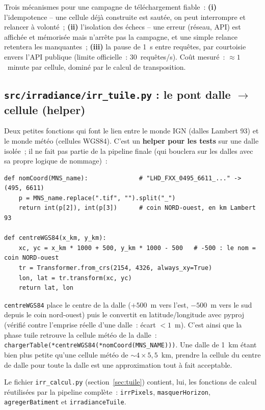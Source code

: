 \documentclass[11pt,a4paper]{article}
\newcommand{\fichier}[1]{\texttt{#1}}
\newcommand{\fonction}[1]{\texttt{#1}}
\begin{document}
Trois mécanismes pour une campagne de téléchargement fiable~:
\textbf{(i)} l'idempotence -- une cellule déjà construite est sautée, on peut
interrompre et relancer à volonté~; \textbf{(ii)} l'isolation des échecs -- une
erreur (réseau, API) est affichée et mémorisée mais n'arrête pas la campagne, et
une simple relance retentera les manquantes~; \textbf{(iii)} la pause de 1~s
entre requêtes, par courtoisie envers l'API publique (limite officielle~:
30~requêtes/s). Coût mesuré~: $\approx 1$~minute par cellule, dominé par le
calcul de transposition.

\subsection{\fichier{src/irradiance/irr\_tuile.py} : le pont dalle $\to$ cellule (helper)}
\label{sec:irrtuile}

Deux petites fonctions qui font le lien entre le monde IGN (dalles Lambert 93)
et le monde météo (cellules WGS84). C'est un \textbf{helper pour les tests} sur
une dalle isolée~; il ne fait pas partie de la pipeline finale (qui bouclera sur
les dalles avec sa propre logique de nommage)~:

\begin{lstlisting}
def nomCoord(MNS_name):              # "LHD_FXX_0495_6611_..." -> (495, 6611)
    p = MNS_name.replace(".tif", "").split("_")
    return int(p[2]), int(p[3])      # coin NORD-ouest, en km Lambert 93

def centreWGS84(x_km, y_km):
    xc, yc = x_km * 1000 + 500, y_km * 1000 - 500   # -500 : le nom = coin NORD-ouest
    tr = Transformer.from_crs(2154, 4326, always_xy=True)
    lon, lat = tr.transform(xc, yc)
    return lat, lon
\end{lstlisting}

\fonction{centreWGS84} place le centre de la dalle ($+500$~m vers l'est,
$-500$~m vers le sud depuis le coin nord-ouest) puis le convertit en
latitude/longitude avec pyproj (vérifié contre l'emprise réelle d'une dalle~:
écart $< 1$~m). C'est ainsi que la phase tuile retrouve la cellule météo de la
dalle~: \fonction{chargerTable(*centreWGS84(*nomCoord(MNS\_NAME)))}.
Une dalle de 1~km étant bien plus petite qu'une cellule météo de
$\sim 4 \times 5{,}5$~km, prendre la cellule du centre de dalle pour toute la
dalle est une approximation tout à fait acceptable.

\medskip\noindent
Le fichier \fichier{irr\_calcul.py} (section~\ref{sec:tuile}) contient, lui, les
fonctions de calcul réutilisées par la pipeline complète~: \fonction{irrPixels},
\fonction{masquerHorizon}, \fonction{agregerBatiment} et \fonction{irradianceTuile}.
\end{document}
